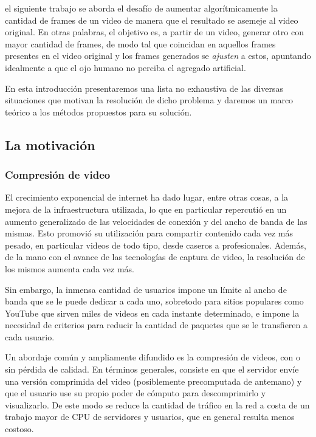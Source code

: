  el siguiente trabajo se aborda el desafío de aumentar algorítmicamente la cantidad de frames de un video de manera que el resultado se asemeje al video original. En otras palabras, el objetivo es, a partir de un video, generar otro con mayor cantidad de frames, de modo tal que coincidan en aquellos frames presentes en el video original y los frames generados se \emph{ajusten} a estos, apuntando idealmente a que el ojo humano no perciba el agregado artificial.

En esta introducción presentaremos una lista no exhaustiva de las diversas situaciones que motivan la resolución de dicho problema y daremos un marco teórico a los métodos propuestos para su solución.

\subsection{La motivación}
\subsubsection{Compresión de video}
El crecimiento exponencial de internet ha dado lugar, entre otras cosas\cite{TP2}, a la mejora de la infraestructura utilizada, lo que en particular repercutió en un aumento generalizado de las velocidades de conexión y del ancho de banda de las mismas. Esto promovió su utilización para compartir contenido cada vez más pesado, en particular videos de todo tipo, desde caseros a profesionales. Además, de la mano con el avance de las tecnologías de captura de video, la resolución de los mismos aumenta cada vez más.

Sin embargo, la inmensa cantidad de usuarios impone un límite al ancho de banda que se le puede dedicar a cada uno, sobretodo para sitios populares como YouTube que sirven miles de videos en cada instante determinado, e impone la necesidad de criterios para reducir la cantidad de paquetes que se le transfieren a cada usuario.

Un abordaje común y ampliamente difundido es la compresión de videos, con o sin pérdida de calidad. En términos generales, consiste en que el servidor envíe una versión comprimida del video (posiblemente precomputada de antemano) y que el usuario use su propio poder de cómputo para descomprimirlo y visualizarlo. De este modo se reduce la cantidad de tráfico en la red a costa de un trabajo mayor de CPU de servidores y usuarios, que en general resulta menos costoso.

